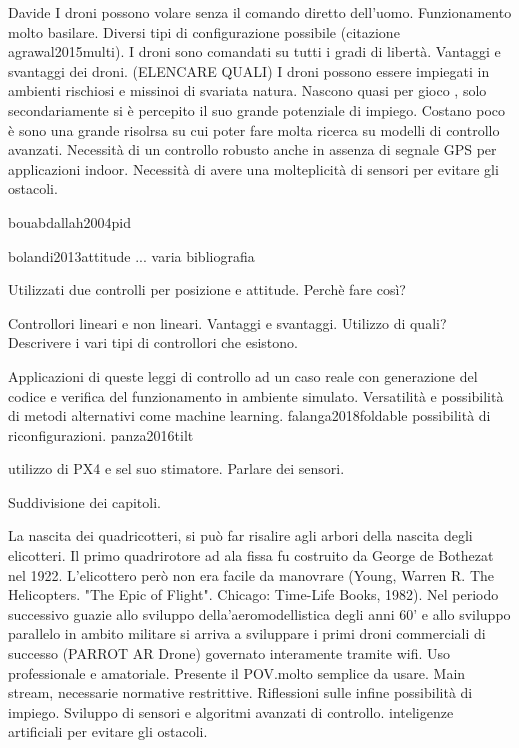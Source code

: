 \begin{commento}
	Davide 
	I droni possono volare senza il comando diretto dell'uomo. 
	Funzionamento molto basilare.
	Diversi tipi di configurazione possibile (citazione agrawal2015multi).
	I droni sono comandati su tutti i gradi di libertà.
	Vantaggi e svantaggi dei droni. (ELENCARE QUALI)
	I droni possono essere impiegati in ambienti rischiosi e missinoi di svariata natura.
	Nascono quasi per gioco , solo secondariamente si è percepito il suo grande potenziale di impiego.
	Costano poco è sono una grande risolrsa su cui poter fare molta ricerca su modelli di controllo avanzati.
	Necessità di un controllo robusto anche in assenza di segnale GPS per applicazioni indoor.
	Necessità di avere una molteplicità di sensori per evitare gli ostacoli.
	
	bouabdallah2004pid
	
	bolandi2013attitude ... varia bibliografia
	
	Utilizzati due controlli per posizione e attitude. Perchè fare così?
	
	Controllori lineari e non lineari. Vantaggi e svantaggi. Utilizzo di quali? Descrivere i vari tipi di controllori che esistono.
	
	Applicazioni di queste leggi di controllo ad un caso reale con generazione del codice e verifica del funzionamento in ambiente simulato.
	Versatilità e possibilità di metodi alternativi come machine learning.
	falanga2018foldable possibilità di riconfigurazioni. panza2016tilt
	
	utilizzo di PX4 e sel suo stimatore.
	Parlare dei sensori.
	
	Suddivisione dei capitoli.
\end{commento}
\begin{commento}
	La nascita dei quadricotteri, si può far risalire agli arbori della nascita degli elicotteri.
	Il primo quadrirotore ad ala fissa fu costruito da George de Bothezat nel 1922. L'elicottero però non era facile da manovrare (Young, Warren R. The Helicopters. "The Epic of Flight". Chicago: Time-Life Books, 1982).
	Nel periodo successivo guazie allo sviluppo della'aeromodellistica degli anni 60' e allo sviluppo parallelo in ambito militare si arriva a sviluppare i primi droni commerciali di successo (PARROT AR Drone) governato interamente tramite wifi. Uso professionale e amatoriale. Presente il POV.molto semplice da usare. Main stream, necessarie normative restrittive. Riflessioni sulle infine possibilità di impiego. Sviluppo di sensori e algoritmi avanzati di controllo. inteligenze artificiali per evitare gli ostacoli.
\end{commento}

